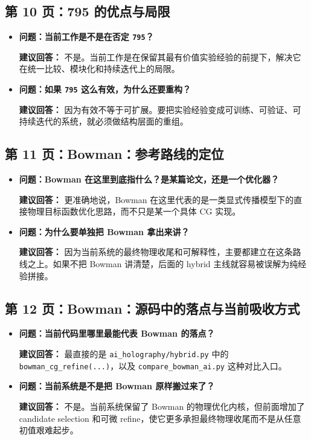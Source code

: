 \documentclass[12pt,a4paper]{ctexart}
\begin{document}
\subsection{第 10 页：795 的优点与局限}
\begin{itemize}
\item \textbf{问题：当前工作是不是在否定 \texttt{795}？}

\textbf{建议回答：} 不是。当前工作是在保留其最有价值实验经验的前提下，解决它在统一比较、模块化和持续迭代上的局限。

\item \textbf{问题：如果 \texttt{795} 这么有效，为什么还要重构？}

\textbf{建议回答：} 因为有效不等于可扩展。要把实验经验变成可训练、可验证、可持续迭代的系统，就必须做结构层面的重组。
\end{itemize}

\subsection{第 11 页：Bowman：参考路线的定位}
\begin{itemize}
\item \textbf{问题：Bowman 在这里到底指什么？是某篇论文，还是一个优化器？}

\textbf{建议回答：} 更准确地说，Bowman 在这里代表的是一类显式传播模型下的直接物理目标函数优化思路，而不只是某一个具体 CG 实现。

\item \textbf{问题：为什么要单独把 Bowman 拿出来讲？}

\textbf{建议回答：} 因为当前系统的最终物理收尾和可解释性，主要都建立在这条路线之上。如果不把 Bowman 讲清楚，后面的 hybrid 主线就容易被误解为纯经验拼接。
\end{itemize}

\subsection{第 12 页：Bowman：源码中的落点与当前吸收方式}
\begin{itemize}
\item \textbf{问题：当前代码里哪里最能代表 Bowman 的落点？}

\textbf{建议回答：} 最直接的是 \texttt{ai\_holography/hybrid.py} 中的 \texttt{bowman\_cg\_refine(...)}，以及 \texttt{compare\_bowman\_ai.py} 这种对比入口。

\item \textbf{问题：当前系统是不是把 Bowman 原样搬过来了？}

\textbf{建议回答：} 不是。当前系统保留了 Bowman 的物理优化内核，但前面增加了 candidate selection 和可微 refine，使它更多承担最终物理收尾而不是从任意初值艰难起步。
\end{itemize}
\end{document}
